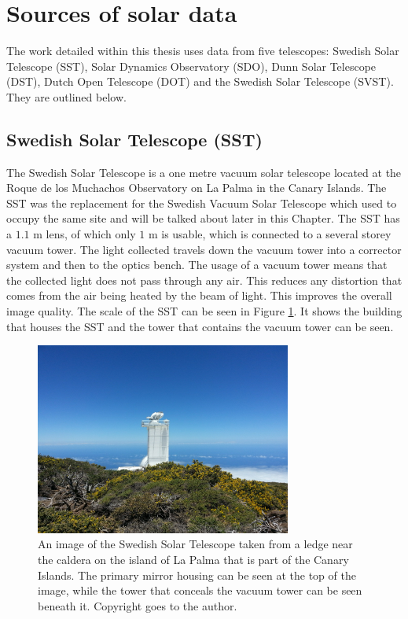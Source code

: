 \section{Sources of solar data}

	The work detailed within this thesis uses data from five telescopes: Swedish Solar Telescope (SST), Solar Dynamics Observatory (SDO), Dunn Solar Telescope (DST), Dutch Open Telescope (DOT) and the Swedish Solar Telescope (SVST).
    They are outlined below.
    
\subsection{Swedish Solar Telescope (SST)}

	The Swedish Solar Telescope is a one metre vacuum solar telescope located at the Roque de los Muchachos Observatory on La Palma in the Canary Islands.
	The SST was the replacement for the Swedish Vacuum Solar Telescope which used to occupy the same site and will be talked about later in this Chapter.
	The SST has a $1.1$ m lens, of which only $1$ m is usable, which is connected to a several storey vacuum tower. 
    The light collected travels down the vacuum tower into a corrector system and then to the optics bench. 
    The usage of a vacuum tower means that the collected light does not pass through any air.
    This reduces any distortion that comes from the air being heated by the beam of light.
    This improves the overall image quality. 
    The scale of the SST can be seen in Figure \ref{fig:SST}.
    It shows the building that houses the SST and the tower that contains the vacuum tower can be seen.    
	\begin{figure}
        \centering
        \includegraphics[width=0.75\textwidth]{SST.jpg}
        \caption{
            An image of the Swedish Solar Telescope taken from a ledge near the caldera on the island of La Palma that is part of the Canary Islands.
            The primary mirror housing can be seen at the top of the image, while the tower that conceals the vacuum tower can be seen beneath it.
            Copyright goes to the author.
           }
           \label{fig:SST}
   \end{figure}
         
